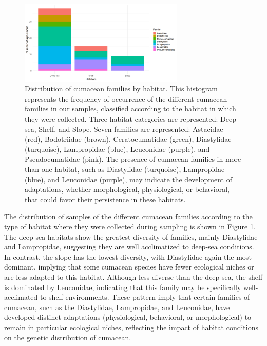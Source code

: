 \begin{figure}[]
    \centering
    \includegraphics[width=0.7\textwidth]{figure4.png}
    \caption{Distribution of cumacean families by habitat. This histogram represents the frequency of occurrence of the different cumacean families in our samples, classified according to the habitat in which they were collected. Three habitat categories are represented: Deep sea, Shelf, and Slope. Seven families are represented: Astacidae (red), Bodotriidae (brown), Ceratocumatidae (green), Diastylidae (turquoise), Lampropidae (blue), Leuconidae (purple), and Pseudocumatidae (pink). The presence of cumacean families in more than one habitat, such as Diastylidae (turquoise), Lampropidae (blue), and Leuconidae (purple), may indicate the development of adaptations, whether morphological, physiological, or behavioral, that could favor their persistence in these habitats. \label{fig:fig5}}
\end{figure}

The distribution of samples of the different cumacean families according to the type of habitat where they were collected during sampling is shown in Figure \ref{fig:fig5}. The deep-sea habitats show the greatest diversity of families, mainly Diastylidae and Lampropidae, suggesting they are well acclimatized to deep-sea conditions. In contrast, the slope has the lowest diversity, with Diastylidae again the most dominant, implying that some cumacean species have fewer ecological niches or are less adapted to this habitat. Although less diverse than the deep sea, the shelf is dominated by Leuconidae, indicating that this family may be specifically well-acclimated to shelf environments. These pattern imply that certain families of cumacean, such as the Diastylidae, Lampropidae, and Leuconidae, have developed distinct adaptations (physiological, behavioral, or morphological) to remain in particular ecological niches, reflecting the impact of habitat conditions on the genetic distribution of cumacean.

